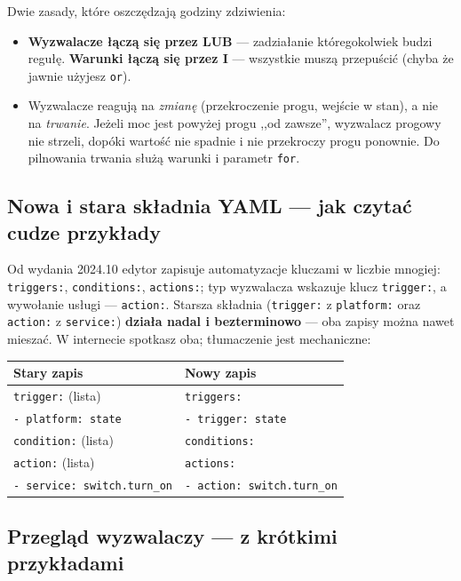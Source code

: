 \documentclass[11pt,a4paper]{article}
\begin{document}
Dwie zasady, które oszczędzają godziny zdziwienia:
\begin{itemize}
\item \textbf{Wyzwalacze łączą się przez LUB} --- zadziałanie któregokolwiek budzi regułę. \textbf{Warunki łączą się przez I} --- wszystkie muszą przepuścić (chyba że jawnie użyjesz \texttt{or}).
\item Wyzwalacze reagują na \emph{zmianę} (przekroczenie progu, wejście w stan), a nie na \emph{trwanie}. Jeżeli moc jest powyżej progu ,,od zawsze'', wyzwalacz progowy nie strzeli, dopóki wartość nie spadnie i nie przekroczy progu ponownie. Do pilnowania trwania służą warunki i parametr \texttt{for}.
\end{itemize}

\subsection{Nowa i stara składnia YAML --- jak czytać cudze przykłady}

Od wydania 2024.10 edytor zapisuje automatyzacje kluczami w liczbie mnogiej: \texttt{triggers:}, \texttt{conditions:}, \texttt{actions:}; typ wyzwalacza wskazuje klucz \texttt{trigger:}, a wywołanie usługi --- \texttt{action:}. Starsza składnia (\texttt{trigger:} z \texttt{platform:} oraz \texttt{action:} z \texttt{service:}) \textbf{działa nadal i bezterminowo} --- oba zapisy można nawet mieszać. W internecie spotkasz oba; tłumaczenie jest mechaniczne:

\begin{center}
\begin{tabular}{ll}
\toprule
\textbf{Stary zapis} & \textbf{Nowy zapis}\\
\midrule
\texttt{trigger:} (lista) & \texttt{triggers:}\\
\texttt{- platform: state} & \texttt{- trigger: state}\\
\texttt{condition:} (lista) & \texttt{conditions:}\\
\texttt{action:} (lista) & \texttt{actions:}\\
\texttt{- service: switch.turn\_on} & \texttt{- action: switch.turn\_on}\\
\bottomrule
\end{tabular}
\end{center}

\subsection{Przegląd wyzwalaczy --- z krótkimi przykładami}
\end{document}
